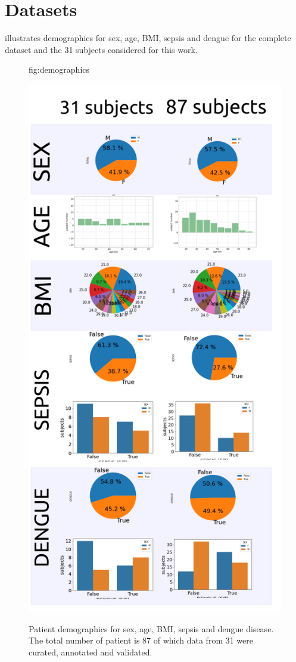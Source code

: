 \documentclass[mlabstract,twocolumn]{jmlr}
\begin{document}
\section{Datasets}\label{apd:datasets}
 illustrates demographics for sex, age, BMI, sepsis and dengue for the complete dataset and the 31 subjects considered for this work.
\begin{figure}[htbp]
\floatconts
  {fig:demographics}
  {\caption{
      Patient demographics for sex, age, BMI, sepsis and dengue disease.
      The total number of patient is 87 of which data from 31 were curated, annotated and validated.}} %
  {\includegraphics[width=\columnwidth]{../figures/patient-demographics-and-diseases/versions/drawing-v03}}%

\end{figure}
\end{document}
